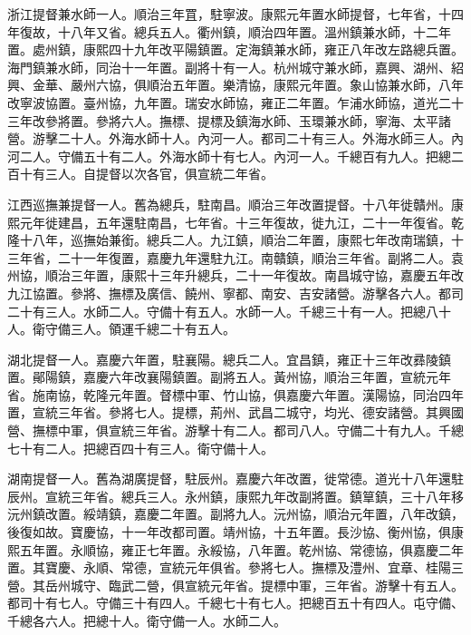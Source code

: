 \begin{pinyinscope}
浙江提督兼水師一人。順治三年罝，駐寧波。康熙元年置水師提督，七年省，十四年復故，十八年又省。總兵五人。衢州鎮，順治四年置。溫州鎮兼水師，十二年置。處州鎮，康熙四十九年改平陽鎮置。定海鎮兼水師，雍正八年改左路總兵置。海門鎮兼水師，同治十一年置。副將十有一人。杭州城守兼水師，嘉興、湖州、紹興、金華、嚴州六協，俱順治五年置。樂清協，康熙元年置。象山協兼水師，八年改寧波協置。臺州協，九年置。瑞安水師協，雍正二年置。乍浦水師協，道光二十三年改參將置。參將六人。撫標、提標及鎮海水師、玉環兼水師，寧海、太平諸營。游擊二十人。外海水師十人。內河一人。都司二十有三人。外海水師三人。內河二人。守備五十有二人。外海水師十有七人。內河一人。千總百有九人。把總二百十有三人。自提督以次各官，俱宣統二年省。

江西巡撫兼提督一人。舊為總兵，駐南昌。順治三年改置提督。十八年徙贛州。康熙元年徙建昌，五年還駐南昌，七年省。十三年復故，徙九江，二十一年復省。乾隆十八年，巡撫始兼銜。總兵二人。九江鎮，順治二年置，康熙七年改南瑞鎮，十三年省，二十一年復置，嘉慶九年還駐九江。南贛鎮，順治三年省。副將二人。袁州協，順治三年置，康熙十三年升總兵，二十一年復故。南昌城守協，嘉慶五年改九江協置。參將、撫標及廣信、饒州、寧都、南安、吉安諸營。游擊各六人。都司二十有三人。水師二人。守備十有五人。水師一人。千總三十有一人。把總八十人。衛守備三人。領運千總二十有五人。

湖北提督一人。嘉慶六年置，駐襄陽。總兵二人。宜昌鎮，雍正十三年改彞陵鎮置。鄖陽鎮，嘉慶六年改襄陽鎮置。副將五人。黃州協，順治三年置，宣統元年省。施南協，乾隆元年置。督標中軍、竹山協，俱嘉慶六年置。漢陽協，同治四年置，宣統三年省。參將七人。提標，荊州、武昌二城守，均光、德安諸營。其興國營、撫標中軍，俱宣統三年省。游擊十有二人。都司八人。守備二十有九人。千總七十有二人。把總百四十有三人。衛守備十人。

湖南提督一人。舊為湖廣提督，駐辰州。嘉慶六年改置，徙常德。道光十八年還駐辰州。宣統三年省。總兵三人。永州鎮，康熙九年改副將置。鎮筸鎮，三十八年移沅州鎮改置。綏靖鎮，嘉慶二年置。副將九人。沅州協，順治元年置，八年改鎮，後復如故。寶慶協，十一年改都司置。靖州協，十五年置。長沙協、衡州協，俱康熙五年置。永順協，雍正七年置。永綏協，八年置。乾州協、常德協，俱嘉慶二年置。其寶慶、永順、常德，宣統元年俱省。參將七人。撫標及澧州、宜章、桂陽三營。其岳州城守、臨武二營，俱宣統元年省。提標中軍，三年省。游擊十有五人。都司十有七人。守備三十有四人。千總七十有七人。把總百五十有四人。屯守備、千總各六人。把總十人。衛守備一人。水師二人。


\end{pinyinscope}
